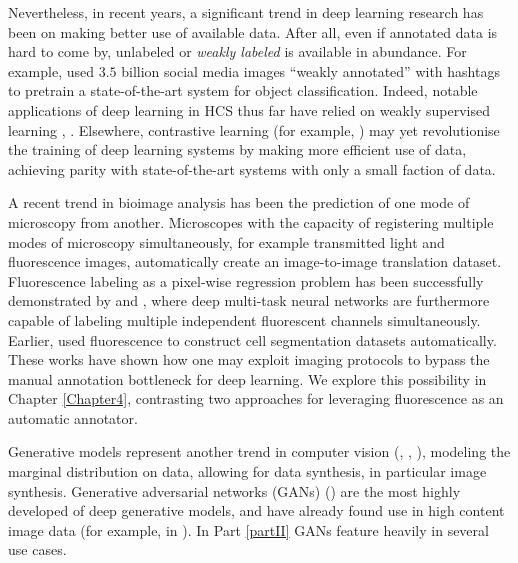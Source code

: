 Nevertheless, in recent years, a significant trend in deep learning research has been on making better use of available data. After all, even if annotated data is hard to come by, unlabeled or \emph{weakly labeled} is available in abundance. For example, \cite{mahajan2018exploring} used $3.5$ billion social media images ``weakly annotated'' with hashtags to pretrain a state-of-the-art system for object classification. Indeed, notable applications of deep learning in HCS thus far have relied on weakly supervised learning \cite{kraus2016classifying}, \cite{godinez2017multi}. Elsewhere, contrastive learning (for example, \cite{chen2020simple}) may yet revolutionise the training of deep learning systems by making more efficient use of data, achieving parity with state-of-the-art systems with only a small faction of data.

A recent trend in bioimage analysis has been the prediction of one mode of microscopy from another. Microscopes with the capacity of registering multiple modes of microscopy simultaneously, for example transmitted light and fluorescence images, automatically create an image-to-image translation dataset. Fluorescence labeling as a pixel-wise regression problem has been successfully demonstrated by \cite{christiansen2018silico} and \cite{ounkomol2018label}, where deep multi-task neural networks are furthermore capable of labeling multiple independent fluorescent channels simultaneously. Earlier, \cite{sadanandan2017automated} used fluorescence to construct cell segmentation datasets automatically. These works have shown how one may exploit imaging protocols to bypass the manual annotation bottleneck for deep learning. We explore this possibility in Chapter \ref{Chapter4}, contrasting two approaches for leveraging fluorescence as an automatic annotator.

Generative models represent another trend in computer vision (\cite{kingma2013auto}, \cite{goodfellow2014explaining}, \cite{oord2016pixel}), modeling the marginal distribution on data, allowing for data synthesis, in particular image synthesis. Generative adversarial networks (GANs) (\cite{goodfellow2014explaining}) are the most highly developed of deep generative models, and have already found use in high content image data (for example, in \cite{osokin2017gans}). In Part \ref{partII} GANs feature heavily in several use cases.

